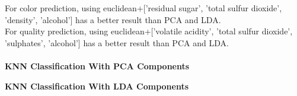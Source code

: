 \documentclass[12pt]{article}
\begin{document}
\noindent
For color prediction, using euclidean+['residual sugar', 'total sulfur dioxide', 'density', 'alcohol'] has a better result than PCA and LDA.\\
For quality prediction, using euclidean+['volatile acidity', 'total sulfur dioxide', 'sulphates', 'alcohol'] has a better result than PCA and LDA.\\\\
\textbf{KNN Classification With PCA Components}
\begin{figure}[H]
\captionsetup[subfigure]{labelformat=empty}
\centering
{}
\end{figure}
\noindent
\textbf{KNN Classification With LDA Components}
\begin{figure}[H]
\captionsetup[subfigure]{labelformat=empty}
\centering
{}
\end{figure}
\end{document}
